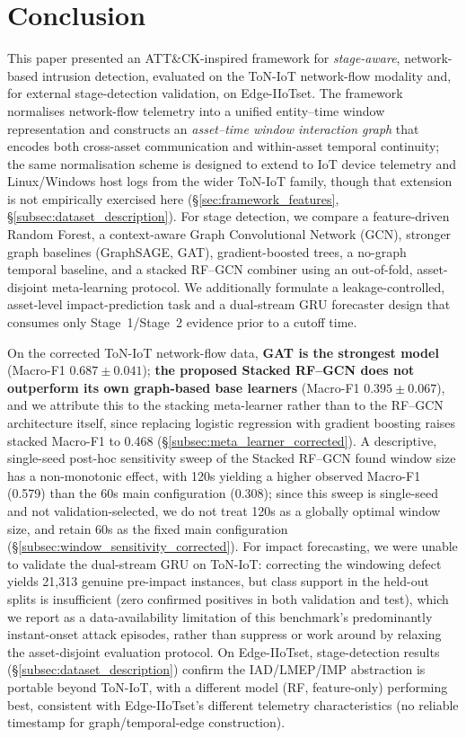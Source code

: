 \documentclass[pdflatex,sn-mathphys-num]{sn-jnl}
\theoremstyle{thmstyleone}%
\theoremstyle{thmstyletwo}%
\theoremstyle{thmstylethree}%
\begin{document}
\section{Conclusion}
\label{sec:8}

This paper presented an ATT\&CK-inspired framework for \emph{stage-aware}, network-based intrusion detection, evaluated on the ToN-IoT network-flow modality and, for external stage-detection validation, on Edge-IIoTset. The framework normalises network-flow telemetry into a unified entity--time window representation and constructs an \emph{asset--time window interaction graph} that encodes both cross-asset communication and within-asset temporal continuity; the same normalisation scheme is designed to extend to IoT device telemetry and Linux/Windows host logs from the wider ToN-IoT family, though that extension is not empirically exercised here (\S\ref{sec:framework_features}, \S\ref{subsec:dataset_description}). For stage detection, we compare a feature-driven Random Forest, a context-aware Graph Convolutional Network (GCN), stronger graph baselines (GraphSAGE, GAT), gradient-boosted trees, a no-graph temporal baseline, and a stacked RF--GCN combiner using an out-of-fold, asset-disjoint meta-learning protocol. We additionally formulate a leakage-controlled, asset-level impact-prediction task and a dual-stream GRU forecaster design that consumes only Stage~1/Stage~2 evidence prior to a cutoff time.

On the corrected ToN-IoT network-flow data, \textbf{GAT is the strongest model} (Macro-F1 $0.687\pm0.041$); \textbf{the proposed Stacked RF--GCN does not outperform its own graph-based base learners} (Macro-F1 $0.395\pm0.067$), and we attribute this to the stacking meta-learner rather than to the RF--GCN architecture itself, since replacing logistic regression with gradient boosting raises stacked Macro-F1 to 0.468 (\S\ref{subsec:meta_learner_corrected}). A descriptive, single-seed post-hoc sensitivity sweep of the Stacked RF--GCN found window size has a non-monotonic effect, with 120s yielding a higher observed Macro-F1 (0.579) than the 60s main configuration (0.308); since this sweep is single-seed and not validation-selected, we do not treat 120s as a globally optimal window size, and retain 60s as the fixed main configuration (\S\ref{subsec:window_sensitivity_corrected}). For impact forecasting, we were unable to validate the dual-stream GRU on ToN-IoT: correcting the windowing defect yields 21,313 genuine pre-impact instances, but class support in the held-out splits is insufficient (zero confirmed positives in both validation and test), which we report as a data-availability limitation of this benchmark's predominantly instant-onset attack episodes, rather than suppress or work around by relaxing the asset-disjoint evaluation protocol. On Edge-IIoTset, stage-detection results (\S\ref{subsec:dataset_description}) confirm the IAD/LMEP/IMP abstraction is portable beyond ToN-IoT, with a different model (RF, feature-only) performing best, consistent with Edge-IIoTset's different telemetry characteristics (no reliable timestamp for graph/temporal-edge construction).
\end{document}
